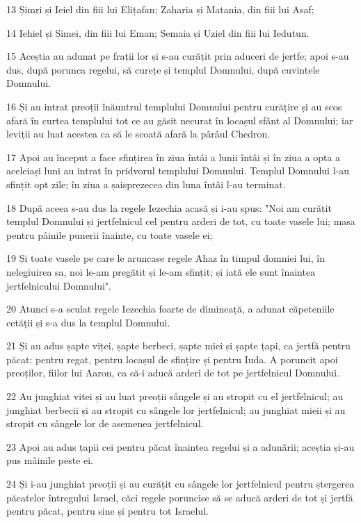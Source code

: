 \par 13 Șimri și Ieiel din fiii lui Elițafan; Zaharia și Matania, din fiii lui Asaf;
\par 14 Iehiel și Șimei, din fiii lui Eman; Șemaia și Uziel din fiii lui Iedutun.
\par 15 Aceștia au adunat pe frații lor și s-au curățit prin aduceri de jertfe; apoi s-au dus, după porunca regelui, să curețe și templul Domnului, după cuvintele Domnului.
\par 16 Și au intrat preoții înăuntrul templului Domnului pentru curățire și au scos afară în curtea templului tot ce au găsit necurat în locașul sfânt al Domnului; iar leviții au luat acestea ca să le scoată afară la pârâul Chedron.
\par 17 Apoi au început a face sfințirea în ziua întâi a lunii întâi și în ziua a opta a aceleiași luni au intrat în pridvorul templului Domnului. Templul Domnului l-au sfințit opt zile; în ziua a șaisprezecea din luna întâi l-au terminat.
\par 18 După aceea s-au dus la regele Iezechia acasă și i-au spus: "Noi am curățit templul Domnului și jertfelnicul cel pentru arderi de tot, cu toate vasele lui; masa pentru pâinile punerii înainte, cu toate vasele ei;
\par 19 Și toate vasele pe care le aruncase regele Ahaz în timpul domniei lui, în nelegiuirea sa, noi le-am pregătit și le-am sfințit; și iată ele sunt înaintea jertfelnicului Domnului".
\par 20 Atunci s-a sculat regele Iezechia foarte de dimineață, a adunat căpeteniile cetății și s-a dus la templul Domnului.
\par 21 Și au adus șapte viței, șapte berbeci, șapte miei și șapte țapi, ca jertfă pentru păcat: pentru regat, pentru locașul de sfințire și pentru Iuda. A poruncit apoi preoților, fiilor lui Aaron, ca să-i aducă arderi de tot pe jertfelnicul Domnului.
\par 22 Au junghiat vitei și au luat preoții sângele și au stropit cu el jertfelnicul; au junghiat berbecii și au stropit cu sângele lor jertfelnicul; au junghiat mieii și au stropit cu sângele lor de asemenea jertfelnicul.
\par 23 Apoi au adus țapii cei pentru păcat înaintea regelui și a adunării; aceștia și-au pus mâinile peste ei.
\par 24 Și i-au junghiat preoții și au curățit cu sângele lor jertfelnicul pentru ștergerea păcatelor întregului Israel, căci regele poruncise să se aducă arderi de tot și jertfă pentru păcat, pentru sine și pentru tot Israelul.
